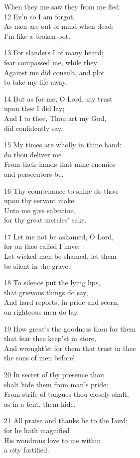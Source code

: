 When they me saw they from me fled.\\
12 Ev’n so I am forgot,\\
As men are out of mind when dead:\\
I’m like a broken pot.

13 For slanders I of many heard;\\
fear compassed me, while they\\
Against me did consult, and plot\\
to take my life away.

14 But as for me, O Lord, my trust\\
upon thee I did lay;\\
And I to thee, Thou art my God,\\
did confidently say.

15 My times are wholly in thine hand:\\
do thou deliver me\\
From their hands that mine enemies\\
and persecutors be.

16 Thy countenance to shine do thou\\
upon thy servant make:\\
Unto me give salvation,\\
for thy great mercies’ sake.

17 Let me not be ashamed, O Lord,\\
for on thee called I have:\\
Let wicked men be shamed, let them\\
be silent in the grave.

18 To silence put the lying lips,\\
that grievous things do say,\\
And hard reports, in pride and scorn,\\
on righteous men do lay.

19 How great’s the goodness thou for them\\
that fear thee keep’st in store,\\
And wrought’st for them that trust in thee\\
the sons of men before!

20 In secret of thy presence thou\\
shalt hide them from man’s pride:\\
From strife of tongues thou closely shalt,\\
as in a tent, them hide.

21 All praise and thanks be to the Lord;\\
for he hath magnified\\
His wondrous love to me within\\
a city fortified.

